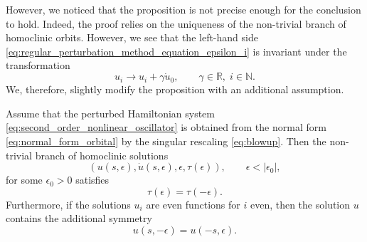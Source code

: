 However, we noticed that the proposition is not precise enough for the
conclusion to hold. Indeed, the proof relies on the uniqueness of the
non-trivial branch of homoclinic orbits. However, we see that the left-hand
side \cref{eq:regular_perturbation_method_equation_epsilon_i} is invariant
under the transformation
\[
u_i \to u_i + \gamma \dot u_0, \qquad \gamma \in\mathbb R, \; i\in\mathbb N.
\]
We, therefore, slightly modify the proposition with an additional assumption.

\begin{proposition}
    \label{proposition:symmetry}
    Assume that the perturbed Hamiltonian system
    \cref{eq:second_order_nonlinear_oscillator} is obtained from the normal form
    \cref{eq:normal_form_orbital} by the singular rescaling
    \cref{eq:blowup}. Then the non-trivial branch of homoclinic solutions 
    \[
        (u(s,\epsilon), \dot u(s, \epsilon), \epsilon, \tau(\epsilon)),
            \qquad \epsilon<|\epsilon_0|,
    \]
    for some $\epsilon_0>0$ satisfies
    \begin{equation}
        \label{eq:tau}
        \tau(\epsilon) = \tau(-\epsilon).
    \end{equation}
    Furthermore, if the solutions $u_i$ are even functions for $i$ even, then 
    the solution $u$ contains the additional symmetry
    \[
        u(s,-\epsilon) = u(-s,\epsilon)
    .\] 
\end{proposition}
